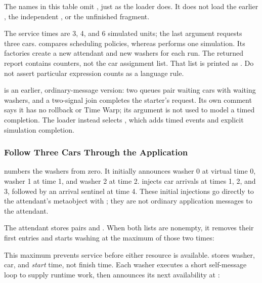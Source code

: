 The names in this table omit , just as the loader does.
It does not load the earlier , the independent
, or the unfinished  fragment.

The service times are 3, 4, and 6 simulated units; the last argument
requests three cars.  compares scheduling policies,
whereas  performs one simulation. Its factories
create a new attendant and new washers for each run.
The returned report contains counters, not the car assignment list.
That list is printed as .
Do not assert particular expression counts as a language rule.

 is an earlier, ordinary-message version:
two queues pair waiting cars with waiting washers, and a two-signal
join completes the starter's request. Its own comment says it has
no rollback or Time Warp; its  argument is not
used to model a timed completion. The loader instead selects
, which adds timed events and explicit
simulation completion.

\subsubsection{Follow Three Cars Through the Application}
\label{sec:tw-application}

 numbers the washers from zero. It initially
announces washer 0 at virtual time 0, washer 1 at time 1, and washer
2 at time 2.  injects car arrivals at times 1, 2,
and 3, followed by an arrival sentinel  at time 4.
These initial injections go directly to the attendant's metaobject
with ; they are not ordinary application messages to
the attendant.

The attendant stores pairs  and .
When both lists are nonempty, it removes their first entries and
starts washing at the maximum of those two times:


This maximum prevents service before either resource is available.
 stores washer, car, and \emph{start} time, not finish
time. Each washer executes a short self-message loop to supply runtime
work, then announces its next availability at
:


